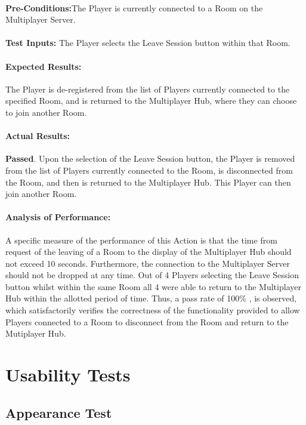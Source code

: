 \documentclass{article}
\begin{document}
    \paragraph{}\textbf{Pre-Conditions:}The Player is currently connected to a Room on the Multiplayer Server.
    \paragraph{}\textbf{Test Inputs:} The Player selects the Leave Session button within that Room.
    \paragraph{Expected Results:} The Player is de-registered from the list of Players currently connected to the specified Room, and is returned to the Multiplayer Hub, where they can choose to join another Room.
    \paragraph{Actual Results:} \textbf{Passed}. Upon the selection of the Leave Session button, the Player is removed from the list of Players currently connected to the Room, is disconnected from the Room, and then is returned to the Multiplayer Hub. This Player can then join another Room.
    \paragraph{Analysis of Performance:} A specific measure of the performance of this Action is that the time from request of the leaving of a Room to the display of the Multiplayer Hub should not exceed 10 seconds. Furthermore, the connection to the Multiplayer Server should not be dropped at any time. Out of 4 Players selecting the Leave Session button whilst within the same Room all 4 were able to return to the Multiplayer Hub within the allotted period of time.  Thus, a pass rate of 100\% , is observed, which satisfactorily verifies the correctness of the functionality provided to allow Players connected to a Room to disconnect from the Room and return to the Mutiplayer Hub.
    
\section{Usability Tests}
\subsection{Appearance Test}
\end{document}
